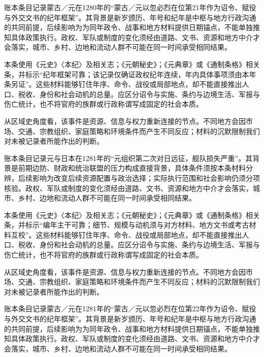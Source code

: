 账本条目记录蒙古／元在1280年的“蒙古／元以忽必烈在位第21年作为诏令、赋役与外交文书的纪年框架”。其背景是新岁颁历、年号和纪年是中枢与地方行政沟通的共同前提，后续影响为为同年政令、战事和地方材料提供日期锚点，不能单独推知具体政策执行。政权、军队或制度的变化须经由道路、文书、资源和地方中介才会落实，城市、乡村、边地和流动人群不可能在同一时间承受相同结果。

本条使用《元史》〈本纪〉及相关志；《元朝秘史》；《元典章》或《通制条格》相关条，并标示“纪年框架可靠；该记录仅确证政权纪年连续，年内具体事项须由本年条另证”。这些材料能够钉住年序、命令、战役或局部地点，却不能直接推出人口、税收、身份和社会动机的总量。应区分诏令与实施、条约与边境生活、军报与伤亡统计，也不将官府的族群或行政称谓写成固定的社会本质。

从区域史角度看，该事件是资源、信息与权力重新连接的节点。不同地方会因市场、交通、宗教组织、家庭策略和环境条件而产生不同反应；材料的沉默限制我们对未被记录者所能作出的判断。

账本条目记录元与日本在1281年的“元组织第二次对日远征，舰队损失严重”。其背景是前期边防、财政和统治联盟的压力构成直接背景，具体条件须按本条材料分辨，后续影响为改变后续资源配置与政治选择；实际执行范围和社会影响仍须分项核验。政权、军队或制度的变化须经由道路、文书、资源和地方中介才会落实，城市、乡村、边地和流动人群不可能在同一时间承受相同结果。

本条使用《元史》〈本纪〉及相关志；《元朝秘史》；《元典章》或《通制条格》相关条，并标示“编年主干可靠；细节、规模与动机须与对方材料、地方文书或考古材料互校”。这些材料能够钉住年序、命令、战役或局部地点，却不能直接推出人口、税收、身份和社会动机的总量。应区分诏令与实施、条约与边境生活、军报与伤亡统计，也不将官府的族群或行政称谓写成固定的社会本质。

从区域史角度看，该事件是资源、信息与权力重新连接的节点。不同地方会因市场、交通、宗教组织、家庭策略和环境条件而产生不同反应；材料的沉默限制我们对未被记录者所能作出的判断。

账本条目记录蒙古／元在1281年的“蒙古／元以忽必烈在位第22年作为诏令、赋役与外交文书的纪年框架”。其背景是新岁颁历、年号和纪年是中枢与地方行政沟通的共同前提，后续影响为为同年政令、战事和地方材料提供日期锚点，不能单独推知具体政策执行。政权、军队或制度的变化须经由道路、文书、资源和地方中介才会落实，城市、乡村、边地和流动人群不可能在同一时间承受相同结果。

